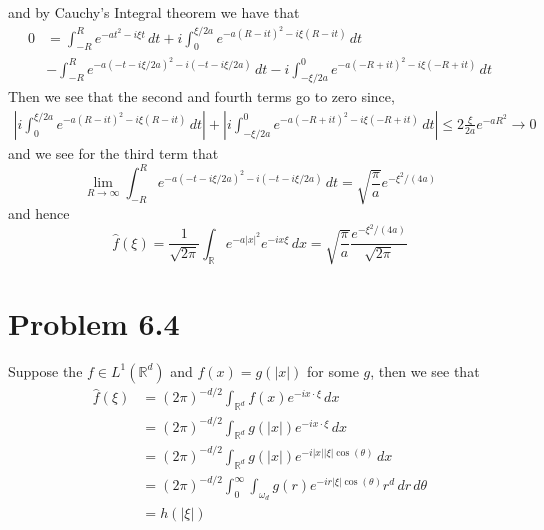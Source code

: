 \documentclass[12pt]{report}
\begin{document}
and by Cauchy's Integral theorem we have that 
\begin{align*}
  0 &= \int_{-R}^R e^{-at^2 -i\xi t} \, dt + i\int_{0}^{\xi/2a} e^{-a(R - it)^2 - i\xi(R - it)} \, dt \\
                                   &- \int_{-R}^R e^{-a(-t - i\xi/2a)^2 - i(-t - i\xi/2a)} \, dt  - i\int_{-\xi/2a}^0 e^{-a(-R + it)^2 - i\xi(-R + it)} \, dt
\end{align*}
Then we see that the second and fourth terms go to zero since,
\begin{align*}
  \left\lvert i\int_{0}^{\xi/2a} e^{-a(R - it)^2 - i\xi(R - it)} \, dt \right\rvert + \left\lvert i\int_{-\xi/2a}^0 e^{-a(-R + it)^2 - i\xi(-R + it)} \, dt\right\rvert \leq 2\frac{\xi}{2a} e^{-aR^2} \to 0
\end{align*}
and we see for the third term that 
\begin{equation*}
  \lim_{R \to \infty} \int_{-R}^R e^{-a(-t - i\xi/2a)^2 - i(-t - i\xi/2a)} \, dt =\sqrt{\frac{\pi}{a}} e^{-\xi^2/(4a)}
\end{equation*}
and hence 
\begin{equation*}
  \hat{f}(\xi) = \frac{1}{\sqrt{2\pi}} \int_{\mathbb{R}} e^{-a|x|^2} e^{-ix\xi} \, dx = \sqrt{\frac{\pi}{a}} \frac{e^{-\xi^2/(4a)}}{\sqrt{2\pi}}
\end{equation*}
\section*{Problem 6.4}
Suppose the $f \in L^1(\mathbb{R}^d)$ and $f(x) = g(|x|)$ for some $g$, then we see that
\begin{align*}
  \hat{f}(\xi) &= (2\pi)^{-d/2} \int_{\mathbb{R}^d} f(x)e^{-i x \cdot \xi} \, dx \\
               &=(2\pi)^{-d/2} \int_{\mathbb{R}^d} g(|x|)e^{-i x \cdot \xi} \, dx \\
               &=(2\pi)^{-d/2} \int_{\mathbb{R}^d} g(|x|)e^{-i |x||\xi| \cos(\theta)} \, dx \\
               &=(2\pi)^{-d/2} \int_0^\infty \int_{\omega_d} g(r)e^{-i r|\xi| \cos(\theta)} r^{d} \, dr\, d\theta \\
               &= h(|\xi|)
\end{align*}
\end{document}
